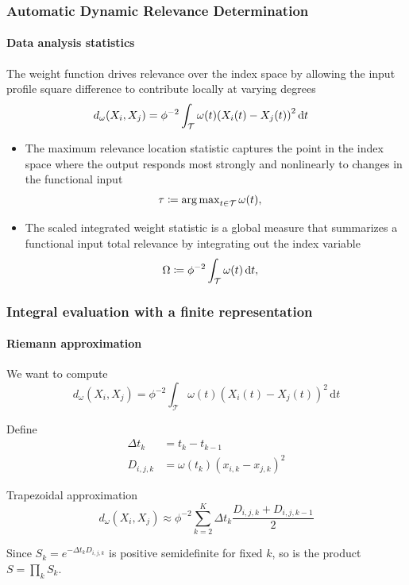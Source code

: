 \documentclass{snedecorbeamer}
\begin{document}
\begin{frame}%
  \label{frm:statistics}
  \frametitle{Automatic Dynamic Relevance Determination}
  \framesubtitle{Data analysis statistics}

  The weight function drives relevance over the index space by allowing the
  input profile square difference to contribute locally at varying degrees
  \begin{align}
    d_\omega(X_i, X_j)
    &= \phi^{-2}\int_{\mathcal{T}}
      \omega(t)
      {\left(X_i(t) - X_j(t) \right)}^2\,\mathrm{d}t
  \end{align}

  \begin{itemize}
  \item The maximum relevance location statistic
    captures the point in the index space where the output responds most
    strongly and nonlinearly to changes in the functional input
    \begin{align}
      \label{eq:01-adrd-maximum-relevance-location}
      \tau&\coloneqq\argmax_{t\in\mathcal{T}}\omega(t),%
    \end{align}
  \item The scaled integrated weight statistic is a global measure that
    summarizes a functional input total relevance by integrating out the index
    variable
  \begin{align}
    \label{eq:01-adrd-scaled-integrated-weight}
    \Omega&\coloneqq\phi^{-2}\int_\mathcal{T}\omega(t)\dx{t},%
  \end{align}
  \end{itemize}
\end{frame}

\begin{frame}%
  \label{frm:integral-riemann}
  \frametitle{Integral evaluation with a finite representation}
  \framesubtitle{Riemann approximation}

  We want to compute
  \begin{equation}
    d_\omega(X_i, X_j) =
    \phi^{-2}\int_\mathcal{T}\omega(t){(X_i(t) - X_j(t))}^2\,\mathrm{d}t
  \end{equation}

  Define
  \begin{align}
    \Delta t_k
    &= t_{k} - t_{k - 1} \\
    D_{i,j,k}
    &= \omega(t_{k}) {\left(x_{i, k} - x_{j, k}\right)}^2
  \end{align}

  Trapezoidal approximation
  \begin{equation}
    d_\omega(X_i, X_j)\approx
    \phi^{-2}\sum_{k = 2}^{K}
    \Delta t_k
    \frac{D_{i, j, k} + D_{i, j, k - 1}}{2}
  \end{equation}

  Since
  $S_k = e^{-\Delta t_k D_{i, j, k}}$ is positive semidefinite for fixed $k$, so
  is the product $S = \prod_{k} S_k$.
\end{frame}
\end{document}
